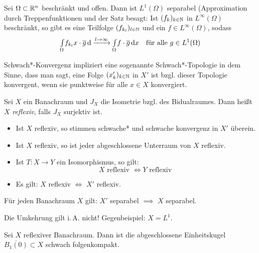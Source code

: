 \documentclass{cheat-sheet}
\newcommand{\IntO}[2]{\Int{\Omega}{}{#1}{#2}} %
\begin{document}
\begin{bsp}
  Sei $\Omega \subset \mathbb{R}^n$ beschränkt und offen. Dann ist $L^1(\Omega)$ separabel (Approximation durch Treppenfunktionen und der Satz besagt: Ist $(f_k)_{k \in \mathbb{N}}$ in $L^{\infty}(\Omega)$ beschränkt, so gibt es eine Teilfolge $(f_{k_l})_{l \in \mathbb{N}}$ und ein $f \in L^\infty(\Omega)$, sodass
  \[ \IntO{f_{k_l}{x} \cdot \overline{g}} \xrightarrow{l \to \infty} \IntO{f \cdot \overline{g}}{x} \quad \text{für alle $g \in L^1(\Omega)$} \]
\end{bsp}

\begin{bem}
  Schwach*-Konvergenz impliziert eine sogenannte Schwach*-Topologie in dem Sinne, dass man sagt, eine Folge $(x_k')_{k \in \mathbb{N}}$ in $X'$ ist bzgl. dieser Topologie konvergent, wenn sie punktweise für alle $x \in X$ konvergiert.
\end{bem}

\begin{definition}
  Sei $X$ ein Banachraum und $J_X$ die Isometrie bzgl. des Bidualraumes. Dann heißt $X$ \emph{reflexiv}, falls $J_X$ surjektiv ist.
\end{definition}

\begin{lem}
  \begin{itemize}
    \item Ist $X$ reflexiv, so stimmen schwache* und schwache konvergenz in $X'$ überein.
    \item Ist $X$ reflexiv, so ist jeder abgeschlossene Unterraum von $X$ reflexiv.
    \item Ist $T : X \to Y$ ein Isomorphismus, so gilt:
      \[ X \text{ reflexiv } \iff Y \text{ reflexiv } \]
    \item Es gilt: $X$ reflexiv $\iff$ $X'$ reflexiv.
  \end{itemize}
\end{lem}

\begin{lem}
  Für jeden Banachraum $X$ gilt: $X'$ separabel $\implies$ $X$ separabel.
\end{lem}

\begin{bem}
  Die Umkehrung gilt i.\,A. nicht! Gegenbeispiel: $X = L^1$.
\end{bem}

\begin{satz}
  Sei $X$ reflexiver Banachraum. Dann ist die abgeschlossene Einheitskugel $\overline{B_1(0)} \subset X$ schwach folgenkompakt.
\end{satz}
\end{document}
